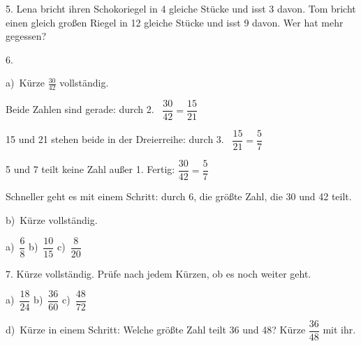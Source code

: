 \documentclass[11pt]{article}
\newcommand{\grau}[1]{{\color{mbgrau}#1}}
\begin{document}
\begin{pfaufg}{}{5.}{}
Lena bricht ihren Schokoriegel in 4 gleiche Stücke und isst 3 davon. Tom bricht einen gleich großen Riegel in 12 gleiche Stücke und isst 9 davon. Wer hat mehr gegessen?
\end{pfaufg}

\begin{pfaufg}{}{6.}{}
\grau{a)\ Kürze $\frac{30}{42}$ vollständig.\par\smallskip Beide Zahlen sind gerade: durch 2. \ $\dfrac{30}{42} = \dfrac{15}{21}$\par 15 und 21 stehen beide in der Dreierreihe: durch 3. \ $\dfrac{15}{21} = \dfrac{5}{7}$\par 5 und 7 teilt keine Zahl außer 1. Fertig: $\dfrac{30}{42} = \dfrac{5}{7}$\par Schneller geht es mit einem Schritt: durch 6, die größte Zahl, die 30 und 42 teilt.}
\par\medskip
b)\ Kürze vollständig. \par\vspace{3pt} a)~$\dfrac{6}{8}$ \qquad b)~$\dfrac{10}{15}$ \qquad c)~$\dfrac{8}{20}$
\end{pfaufg}

\begin{pfaufg}{}{7.}{}
Kürze vollständig. Prüfe nach jedem Kürzen, ob es noch weiter geht. \par\vspace{3pt} a)~$\dfrac{18}{24}$ \qquad b)~$\dfrac{36}{60}$ \qquad c)~$\dfrac{48}{72}$ \par\vspace{3pt} d)~Kürze in einem Schritt: Welche größte Zahl teilt 36 und 48? Kürze $\dfrac{36}{48}$ mit ihr.
\end{pfaufg}
\end{document}
